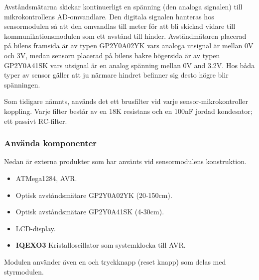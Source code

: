 \documentclass[tekniskrapport/tech.tex]{subfiles}
\begin{document}
Avståndsmätarna skickar kontinuerligt en spänning (den analoga signalen) till
mikrokontrollens AD-omvandlare. Den digitala signalen hanteras hos
sensormodulen så att den omvandlas till meter för att bli skickad vidare till
kommunikationsmodulen som ett avstånd till hinder. Avständmätaren placerad på
bilens framsida är av typen GP2Y0A02YK vars analoga utsignal är mellan 0V och
3V, medan sensorn placerad på bilens bakre högersida är av typen GP2Y0A41SK
vars utsignal är en analog spänning mellan 0V and 3.2V. Hos båda typer av
sensor gäller att ju närmare hindret befinner sig desto högre blir spänningen. 

Som tidigare nämnts, används det ett brusfilter vid varje
sensor-mikrokontroller koppling. Varje filter består av en 18K resistans och en
100nF jordad kondesator; ett passivt RC-filter.

\subsubsection{Använda komponenter}
Nedan är externa produkter som har använts vid sensormodulens konstruktion.
\begin{itemize}
	\item \textbf{\modMicrocontroller} ATMega1284, AVR. 
    \item \textbf{\modDistf} Optisk avståndsmätare GP2Y0A02YK (20-150cm).
    \item \textbf{\modDists} Optisk avståndsmätare GP2Y0A41SK (4-30cm).
    \item \textbf{\modLcd} LCD-display.
    \item \textbf{IQEXO3} Kristalloscillator som systemklocka till AVR.
\end{itemize}
Modulen använder även en {\modJtag} och tryckknapp (reset knapp) som delas med
styrmodulen.
\end{document}
